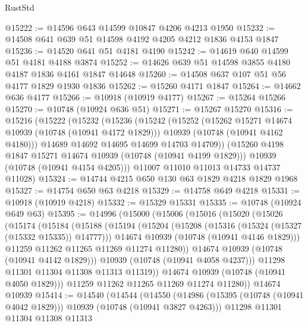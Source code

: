 \begin{lexlean}{RustStd}
\begin{coremodule}
@15222 := @14596 @643 @14599 @10847 @4206 @4213 @1950
@15232 := @14508 @641 @639 @51 @14598 @4192 @4205 @4212 @1836 @4153 @1847
@15236 := @14520 @641 @51 @4181 @4190
@15242 := @14619 @640 @14599 @51 @4181 @4188 @3874
@15252 := @14626 @639 @51 @14598 @3855 @4180 @4187 @1836 @4161 @1847 @14648
@15260 := @14508 @637 @107 @51 @56 @4177 @1829 @1930 @1836
@15262 := @15260 @4171 @1847
@15264 := @14662 @636 @4177
@15266 := @10918 (@10919 @4177)
@15267 := @15264 @15266
@15270 := @10748 (@10924 @636 @51)
@15271 := @15267 @15270
@15316 := @15216
    (@15222
      (@15232
        (@15236
          (@15242
            (@15252
              (@15262 @15271 @14674 @10939 (@10748 (@10941 @4172 @1829)))
              @10939
              (@10748 (@10941 @4162 @4180)))
            @14689
            @14692
            @14695
            @14699
            @14703
            @14709))
        (@15260 @4198 @1847 @15271 @14674 @10939 (@10748 (@10941 @4199 @1829)))
        @10939
        (@10748 (@10941 @4154 @4205)))
      @11007
      @11010
      @11013
      @14733
      @14737
      @11028)
@15324 := @14744 @4215 @650 @130 @63 @1829 @4218 @1829 @1968
@15327 := @14754 @650 @63 @4218
@15329 := @14758 @649 @4218
@15331 := @10918 (@10919 @4218)
@15332 := @15329 @15331
@15335 := @10748 (@10924 @649 @63)
@15395 := @14996
    (@15000
      (@15006
        (@15016
          (@15020
            (@15026
              (@15174
                (@15184
                  (@15188
                    (@15194
                      (@15204
                        (@15208 (@15316 (@15324 (@15327 (@15332 @15335)) @14777)))
                        @14674
                        @10939
                        (@10748 (@10941 @4146 @1829)))
                      @11259
                      @11262
                      @11265
                      @11269
                      @11274
                      @11280))
                  @14674
                  @10939
                  (@10748 (@10941 @4142 @1829)))
                @10939
                (@10748 (@10941 @4058 @4237)))
              @11298
              @11301
              @11304
              @11308
              @11313
              @11319))
          @14674
          @10939
          (@10748 (@10941 @4050 @1829)))
        @11259
        @11262
        @11265
        @11269
        @11274
        @11280))
    @14674
    @10939
@15414 := @14540
    (@14544
      (@14550
        (@14986 (@15395 (@10748 (@10941 @4042 @1829))) @10939 (@10748 (@10941 @3827 @4263)))
        @11298
        @11301
        @11304
        @11308
        @11313

\end{coremodule}
\end{lexlean}
